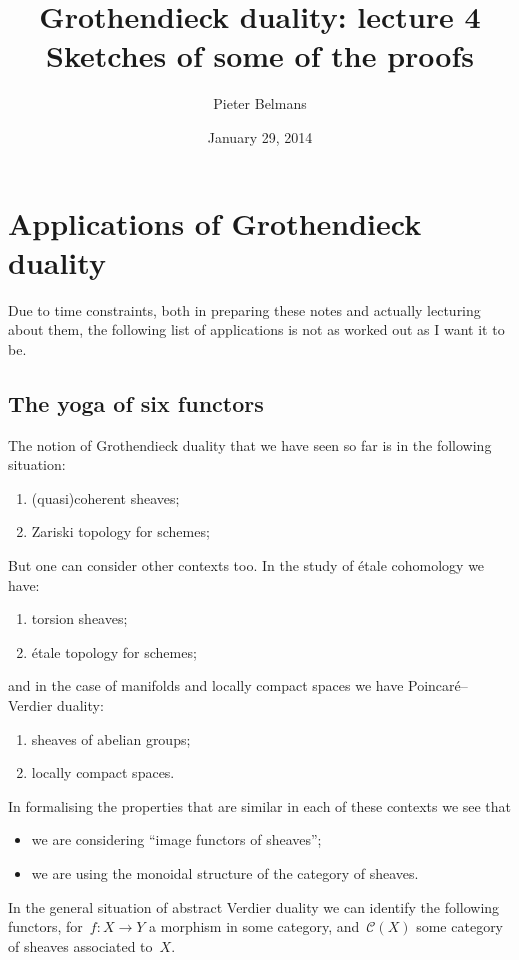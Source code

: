 \documentclass[10pt,a4paper]{article}
\title{Grothendieck duality: lecture 4 \\[.2em] \Large Sketches of some of the proofs}
\author{Pieter Belmans}
\date{January 29, 2014}
\begin{document}
\maketitle

\begin{abstract}
  
\end{abstract}

\tableofcontents

\clearpage

\section{Applications of Grothendieck duality}
\label{section:applications-grothendieck-duality}
Due to time constraints, both in preparing these notes and actually lecturing about them, the following list of applications is not as worked out as I want it to be.

\subsection{The yoga of six functors}
\label{subsection:six-functors-yoga}
The notion of Grothendieck duality that we have seen so far is in the following situation:
\begin{enumerate}
  \item (quasi)coherent sheaves;
  \item Zariski topology for schemes;
\end{enumerate}
But one can consider other contexts too. In the study of \'etale cohomology we have:
\begin{enumerate}
  \item torsion sheaves;
  \item \'etale topology for schemes;
\end{enumerate}
and in the case of manifolds and locally compact spaces we have Poincar\'e--Verdier duality:
\begin{enumerate}
  \item sheaves of abelian groups;
  \item locally compact spaces.
\end{enumerate}

In formalising the properties that are similar in each of these contexts we see that
\begin{itemize}
  \item we are considering ``image functors of sheaves'';
  \item we are using the monoidal structure of the category of sheaves.
\end{itemize}
In the general situation of abstract Verdier duality we can identify the following functors, for~$f\colon X\to Y$ a morphism in some category, and~$\mathcal{C}(X)$ some category of sheaves associated to~$X$.
\end{document}
